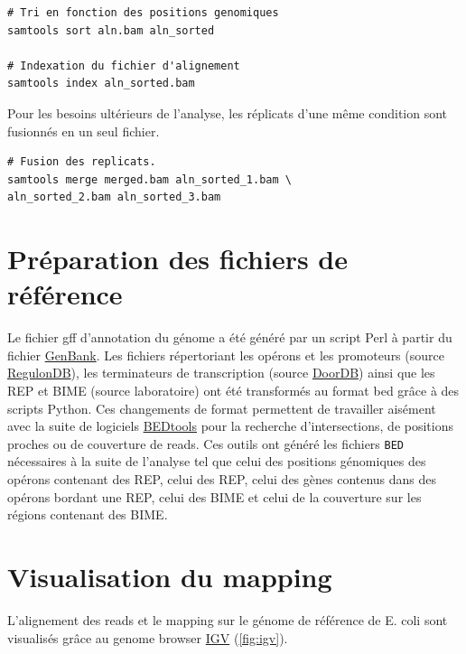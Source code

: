 \documentclass[12pt,a4paper]{report}
\begin{document}
\begin{onehalfspace}
\begin{lstlisting}[frame=single]
# Tri en fonction des positions genomiques
samtools sort aln.bam aln_sorted

# Indexation du fichier d'alignement
samtools index aln_sorted.bam
\end{lstlisting}

Pour les besoins ultérieurs de l'analyse, les réplicats d'une même condition sont fusionnés en un seul fichier.
\begin{lstlisting}[frame=single]
# Fusion des replicats.
samtools merge merged.bam aln_sorted_1.bam \
aln_sorted_2.bam aln_sorted_3.bam
\end{lstlisting}

\section*{Préparation des fichiers de référence}
Le fichier \gls{gff} d'annotation du génome a été généré par un script Perl à partir du fichier \href{http://www.ncbi.nlm.nih.gov/nuccore/NC_000913.2}{GenBank}. Les fichiers répertoriant les opérons et les promoteurs (source \href{http://regulondb.ccg.unam.mx/}{RegulonDB}), les terminateurs de transcription (source \href{http://csbl.bmb.uga.edu/DOOR/}{DoorDB}) ainsi que les REP et BIME (source laboratoire) ont été transformés au format \gls{bed} grâce à des scripts Python.
Ces changements de format permettent de travailler aisément avec la suite de logiciels \href{http://bedtools.readthedocs.org/en/latest/}{BEDtools} pour la recherche d'intersections, de positions proches ou de \gls{couverture} de reads. Ces outils ont généré les fichiers \texttt{BED} nécessaires à la suite de l'analyse tel que celui des positions génomiques des opérons contenant des REP, celui des REP, celui des gènes contenus dans des opérons bordant une REP, celui des BIME et celui de la couverture sur les régions contenant des BIME.

\section*{Visualisation du mapping}
L'alignement des reads et le mapping sur le génome de référence de E. coli sont visualisés grâce au genome browser \href{https://www.broadinstitute.org/igv/}{IGV} \citep{Robinson2011,Thorvaldsdottir2013} (\autoref{fig:igv}).


\end{onehalfspace}
\end{document}
